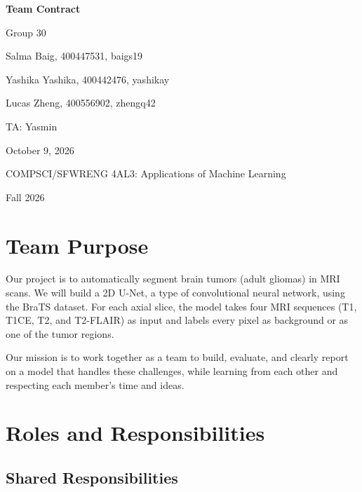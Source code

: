 \documentclass[12pt]{article}
\begin{document}
\begin{titlepage}
  \centering
  \vspace*{2cm}
  {\Huge\bfseries Team Contract\par}
  \vspace{1cm}
  {\Large Group 30\par}
  \vspace{1.5cm}
  {\large
    Salma Baig, 400447531, baigs19\par
    Yashika Yashika, 400442476, yashikay\par
    Lucas Zheng, 400556902, zhengq42\par
  }
  \vspace{1cm}
  {\large TA: Yasmin\par}
  \vspace{1cm}
  {\large October 9, 2026\par}
  \vfill
  {\large COMPSCI/SFWRENG 4AL3: Applications of Machine Learning\par
  Fall 2026\par}
  \vspace*{2cm}
\end{titlepage}

\section{Team Purpose}

Our project is to automatically segment brain tumors (adult gliomas) in MRI scans. We will build a 2D U-Net, a type of convolutional neural network, using the BraTS dataset. For each axial slice, the model takes four MRI sequences (T1, T1CE, T2, and T2-FLAIR) as input and labels every pixel as background or as one of the tumor regions.
 
Our mission is to work together as a team to build, evaluate, and clearly report on a model that handles these challenges, while learning from each other and respecting each member's time and ideas.

\section{Roles and Responsibilities}

\subsection{Shared Responsibilities}
\end{document}
